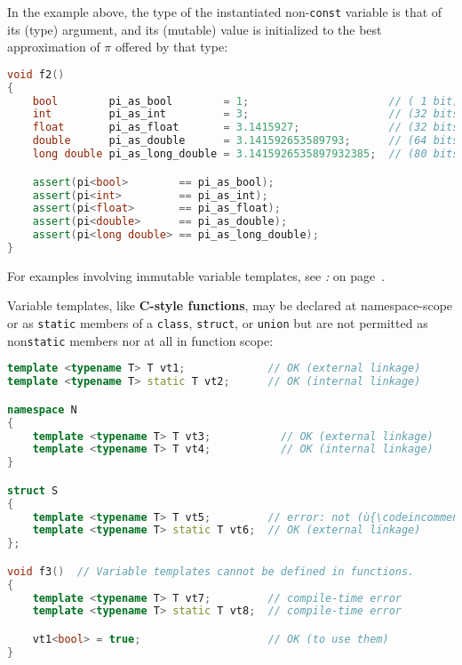 \noindent In the example above, the type of the instantiated non-\texttt{const}
variable is that of its (type) argument, and its (mutable) value is
initialized to the best approximation of \(\pi\) offered by that type:

\begin{lstlisting}[language=C++]
void f2()
{
    bool        pi_as_bool        = 1;                      // ( 1 bit)
    int         pi_as_int         = 3;                      // (32 bits)
    float       pi_as_float       = 3.1415927;              // (32 bits)
    double      pi_as_double      = 3.141592653589793;      // (64 bits)
    long double pi_as_long_double = 3.1415926535897932385;  // (80 bits)

    assert(pi<bool>        == pi_as_bool);
    assert(pi<int>         == pi_as_int);
    assert(pi<float>       == pi_as_float);
    assert(pi<double>      == pi_as_double);
    assert(pi<long double> == pi_as_long_double);
}
\end{lstlisting}
    
\noindent For examples involving immutable variable templates, see {\it{}:} {\it{}} on page~\pageref{parametrized-constants}.

Variable templates, like \textbf{C-style functions}, may be declared at
namespace-scope or as \texttt{static} members of a
\texttt{class}, \texttt{struct}, or \texttt{union} but are not
permitted as non\texttt{static} members nor at all in function scope:

\begin{lstlisting}[language=C++]
template <typename T> T vt1;             // OK (external linkage)
template <typename T> static T vt2;      // OK (internal linkage)

namespace N
{
    template <typename T> T vt3;           // OK (external linkage)
    template <typename T> T vt4;           // OK (internal linkage)
}

struct S
{
    template <typename T> T vt5;         // error: not (ù{\codeincomments{static}}ù)
    template <typename T> static T vt6;  // OK (external linkage)
};

void f3()  // Variable templates cannot be defined in functions.
{
    template <typename T> T vt7;         // compile-time error
    template <typename T> static T vt8;  // compile-time error

    vt1<bool> = true;                    // OK (to use them)
}
\end{lstlisting}
    
